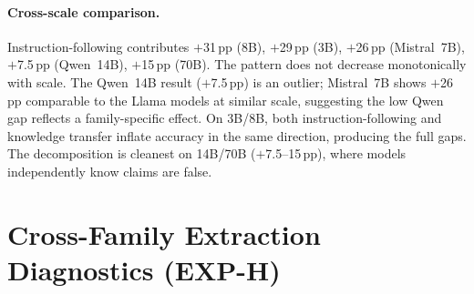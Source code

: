 \paragraph{Cross-scale comparison.} Instruction-following contributes $+$31\,pp (8B), $+$29\,pp (3B), $+$26\,pp (Mistral~7B), $+$7.5\,pp (Qwen~14B), $+$15\,pp (70B). The pattern does not decrease monotonically with scale. The Qwen~14B result ($+$7.5\,pp) is an outlier; Mistral~7B shows $+$26\,pp comparable to the Llama models at similar scale, suggesting the low Qwen gap reflects a family-specific effect. On 3B/8B, both instruction-following and knowledge transfer inflate accuracy in the same direction, producing the full gaps. The decomposition is cleanest on 14B/70B ($+$7.5--15\,pp), where models independently know claims are false.

\section{Cross-Family Extraction Diagnostics (EXP-H)}
\label{app:cross_family_details}

